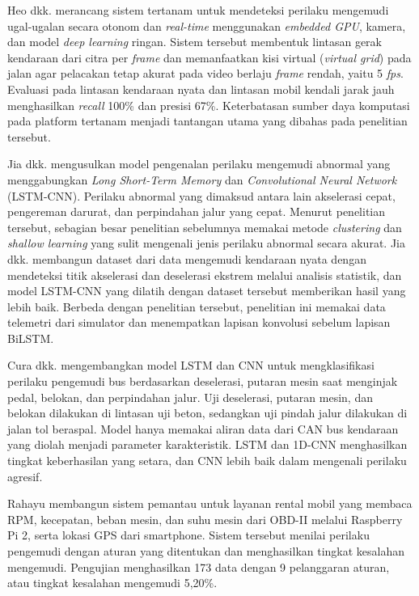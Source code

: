 Heo dkk. merancang sistem tertanam untuk mendeteksi perilaku mengemudi ugal-ugalan secara otonom dan \textit{real-time} menggunakan \textit{embedded GPU}, kamera, dan model \textit{deep learning} ringan. Sistem tersebut membentuk lintasan gerak kendaraan dari citra per \textit{frame} dan memanfaatkan kisi virtual (\textit{virtual grid}) pada jalan agar pelacakan tetap akurat pada video berlaju \textit{frame} rendah, yaitu 5 \textit{fps}. Evaluasi pada lintasan kendaraan nyata dan lintasan mobil kendali jarak jauh menghasilkan \textit{recall} 100\% dan presisi 67\%. Keterbatasan sumber daya komputasi pada platform tertanam menjadi tantangan utama yang dibahas pada penelitian tersebut.

Jia dkk. mengusulkan model pengenalan perilaku mengemudi abnormal yang menggabungkan \textit{Long Short-Term Memory} dan \textit{Convolutional Neural Network} (LSTM-CNN). Perilaku abnormal yang dimaksud antara lain akselerasi cepat, pengereman darurat, dan perpindahan jalur yang cepat. Menurut penelitian tersebut, sebagian besar penelitian sebelumnya memakai metode \textit{clustering} dan \textit{shallow learning} yang sulit mengenali jenis perilaku abnormal secara akurat. Jia dkk. membangun dataset dari data mengemudi kendaraan nyata dengan mendeteksi titik akselerasi dan deselerasi ekstrem melalui analisis statistik, dan model LSTM-CNN yang dilatih dengan dataset tersebut memberikan hasil yang lebih baik. Berbeda dengan penelitian tersebut, penelitian ini memakai data telemetri dari simulator dan menempatkan lapisan konvolusi sebelum lapisan BiLSTM.

Cura dkk. mengembangkan model LSTM dan CNN untuk mengklasifikasi perilaku pengemudi bus berdasarkan deselerasi, putaran mesin saat menginjak pedal, belokan, dan perpindahan jalur. Uji deselerasi, putaran mesin, dan belokan dilakukan di lintasan uji beton, sedangkan uji pindah jalur dilakukan di jalan tol beraspal. Model hanya memakai aliran data dari CAN bus kendaraan yang diolah menjadi parameter karakteristik. LSTM dan 1D-CNN menghasilkan tingkat keberhasilan yang setara, dan CNN lebih baik dalam mengenali perilaku agresif.

Rahayu membangun sistem pemantau untuk layanan rental mobil yang membaca RPM, kecepatan, beban mesin, dan suhu mesin dari OBD-II melalui Raspberry Pi 2, serta lokasi GPS dari smartphone. Sistem tersebut menilai perilaku pengemudi dengan aturan yang ditentukan dan menghasilkan tingkat kesalahan mengemudi. Pengujian menghasilkan 173 data dengan 9 pelanggaran aturan, atau tingkat kesalahan mengemudi 5,20\%.

